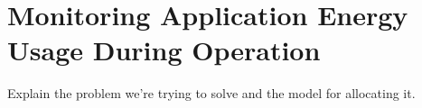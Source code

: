 \chapter{Monitoring Application Energy Usage During Operation}

Explain the problem we're trying to solve and the model for allocating it.
